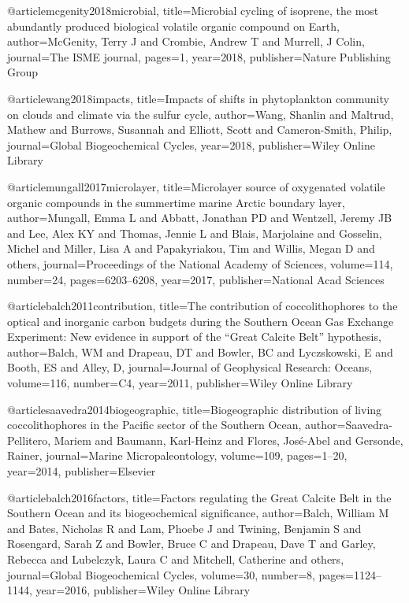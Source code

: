 
@article{mcgenity2018microbial,
  title={Microbial cycling of isoprene, the most abundantly produced biological volatile organic compound on Earth},
  author={McGenity, Terry J and Crombie, Andrew T and Murrell, J Colin},
  journal={The ISME journal},
  pages={1},
  year={2018},
  publisher={Nature Publishing Group}
}

@article{wang2018impacts,
  title={Impacts of shifts in phytoplankton community on clouds and climate via the sulfur cycle},
  author={Wang, Shanlin and Maltrud, Mathew and Burrows, Susannah and Elliott, Scott and Cameron-Smith, Philip},
  journal={Global Biogeochemical Cycles},
  year={2018},
  publisher={Wiley Online Library}
}

@article{mungall2017microlayer,
  title={Microlayer source of oxygenated volatile organic compounds in the summertime marine Arctic boundary layer},
  author={Mungall, Emma L and Abbatt, Jonathan PD and Wentzell, Jeremy JB and Lee, Alex KY and Thomas, Jennie L and Blais, Marjolaine and Gosselin, Michel and Miller, Lisa A and Papakyriakou, Tim and Willis, Megan D and others},
  journal={Proceedings of the National Academy of Sciences},
  volume={114},
  number={24},
  pages={6203--6208},
  year={2017},
  publisher={National Acad Sciences}
}

@article{balch2011contribution,
  title={The contribution of coccolithophores to the optical and inorganic carbon budgets during the Southern Ocean Gas Exchange Experiment: New evidence in support of the “Great Calcite Belt” hypothesis},
  author={Balch, WM and Drapeau, DT and Bowler, BC and Lyczskowski, E and Booth, ES and Alley, D},
  journal={Journal of Geophysical Research: Oceans},
  volume={116},
  number={C4},
  year={2011},
  publisher={Wiley Online Library}
}

@article{saavedra2014biogeographic,
  title={Biogeographic distribution of living coccolithophores in the Pacific sector of the Southern Ocean},
  author={Saavedra-Pellitero, Mariem and Baumann, Karl-Heinz and Flores, Jos{\'e}-Abel and Gersonde, Rainer},
  journal={Marine Micropaleontology},
  volume={109},
  pages={1--20},
  year={2014},
  publisher={Elsevier}
}

@article{balch2016factors,
  title={Factors regulating the Great Calcite Belt in the Southern Ocean and its biogeochemical significance},
  author={Balch, William M and Bates, Nicholas R and Lam, Phoebe J and Twining, Benjamin S and Rosengard, Sarah Z and Bowler, Bruce C and Drapeau, Dave T and Garley, Rebecca and Lubelczyk, Laura C and Mitchell, Catherine and others},
  journal={Global Biogeochemical Cycles},
  volume={30},
  number={8},
  pages={1124--1144},
  year={2016},
  publisher={Wiley Online Library}
}

